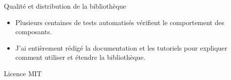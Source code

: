 \begin{frame}{Qualité et distribution de la bibliothèque}
    \begin{itemize}
        \item Plusieurs centaines de tests automatisés vérifient le comportement
              des composants.
        \item J'ai entièrement rédigé la documentation et les tutoriels pour
              expliquer comment utiliser et étendre la bibliothèque.
    \end{itemize}

    \medskip
    \begin{center}
        Licence MIT\hspace{1.5em}
    \end{center}
\end{frame}
